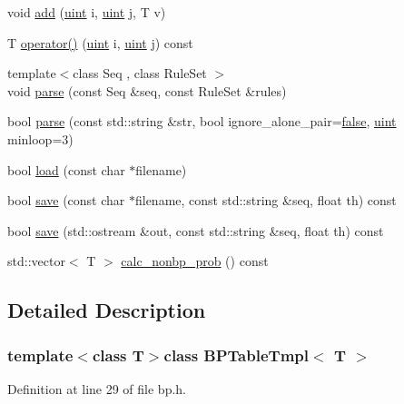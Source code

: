 \begin{DoxyCompactItemize}
void \hyperlink{class_b_p_table_tmpl_a9f52bf7c7204149e01576bbbcf7d3c0d}{add} (\hyperlink{cyktable_8h_a91ad9478d81a7aaf2593e8d9c3d06a14}{uint} i, \hyperlink{cyktable_8h_a91ad9478d81a7aaf2593e8d9c3d06a14}{uint} j, T v)
\item 
T \hyperlink{class_b_p_table_tmpl_ab0f327b7cc4bd8f2ae8f8af6d9a4cdf3}{operator()} (\hyperlink{cyktable_8h_a91ad9478d81a7aaf2593e8d9c3d06a14}{uint} i, \hyperlink{cyktable_8h_a91ad9478d81a7aaf2593e8d9c3d06a14}{uint} j) const 
\item 
{\footnotesize template$<$class Seq , class Rule\+Set $>$ }\\void \hyperlink{class_b_p_table_tmpl_af020cdf7c818a3d66e8f33e9175b6359}{parse} (const Seq \&seq, const Rule\+Set \&rules)
\item 
bool \hyperlink{class_b_p_table_tmpl_a2d953639a734fd0f58afad7ce4942e4c}{parse} (const std\+::string \&str, bool ignore\+\_\+alone\+\_\+pair=\hyperlink{naview_8c_a65e9886d74aaee76545e83dd09011727}{false}, \hyperlink{cyktable_8h_a91ad9478d81a7aaf2593e8d9c3d06a14}{uint} minloop=3)
\item 
bool \hyperlink{class_b_p_table_tmpl_a6aa3d25d6b66d1c143284951bf556706}{load} (const char $\ast$filename)
\item 
bool \hyperlink{class_b_p_table_tmpl_a5295132679f6dcf43a3a127354b27f8f}{save} (const char $\ast$filename, const std\+::string \&seq, float th) const 
\item 
bool \hyperlink{class_b_p_table_tmpl_abe59eb035cddfb500a5836c35bd0a4bb}{save} (std\+::ostream \&out, const std\+::string \&seq, float th) const 
\item 
std\+::vector$<$ T $>$ \hyperlink{class_b_p_table_tmpl_a81db1970843637bd9202fa0688c01bc7}{calc\+\_\+nonbp\+\_\+prob} () const 
\end{DoxyCompactItemize}


\subsection{Detailed Description}
\subsubsection*{template$<$class T$>$class B\+P\+Table\+Tmpl$<$ T $>$}



Definition at line 29 of file bp.\+h.



